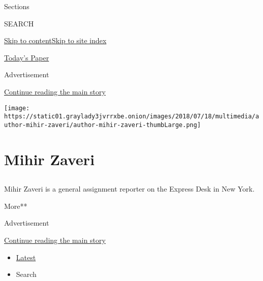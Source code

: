 Sections

SEARCH

\protect\hyperlink{site-content}{Skip to
content}\protect\hyperlink{site-index}{Skip to site index}

\href{https://myaccount.nytimes3xbfgragh.onion/auth/login?response_type=cookie\&client_id=vi}{}

\href{https://www.nytimes3xbfgragh.onion/section/todayspaper}{Today's
Paper}

Advertisement

\protect\hyperlink{after-top}{Continue reading the main story}

\texttt{[image: https://static01.graylady3jvrrxbe.onion/images/2018/07/18/multimedia/author-mihir-zaveri/author-mihir-zaveri-thumbLarge.png]}

\hypertarget{mihir-zaveri}{%
\section{Mihir Zaveri}\label{mihir-zaveri}}

\subsection{}

Mihir Zaveri is a general assignment reporter on the Express Desk in New
York.

More**

Advertisement

\protect\hyperlink{after-mid1}{Continue reading the main story}

\begin{itemize}
\tightlist
\item
  \protect\hyperlink{stream-panel}{Latest}
\item
  Search
\end{itemize}

